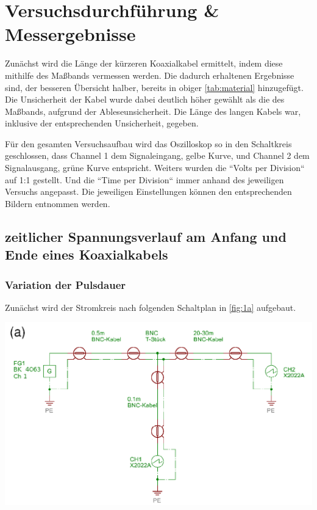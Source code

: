 \documentclass[11pt,ngerman]{scrartcl}
\begin{document}


\section{Versuchsdurchführung \& Messergebnisse}\label{sec:Versuchsdurchführung}

Zunächst wird die Länge der kürzeren Koaxialkabel ermittelt, indem diese
mithilfe des Maßbands vermessen werden. Die dadurch erhaltenen Ergebnisse sind,
der besseren Übersicht halber, bereits in obiger \autoref{tab:material}
hinzugefügt. Die Unsicherheit der Kabel wurde dabei deutlich höher gewählt als
die des Maßbands, aufgrund der Ableseunsicherheit. Die Länge des langen Kabels
war, inklusive der entsprechenden Unsicherheit, gegeben.

\vspace{2mm}

\noindent Für den gesamten Versuchsaufbau wird das Oszilloskop so in den
Schaltkreis geschlossen, dass Channel 1 dem Signaleingang, gelbe Kurve, und
Channel 2 dem Signalausgang, grüne Kurve entspricht.  Weiters wurden die
``Volts per Division`` auf 1:1 gestellt. Und die ``Time per Division`` immer
anhand des jeweiligen Versuchs angepasst. Die jeweiligen Einstellungen können
den entsprechenden Bildern entnommen werden.

\newpage

\subsection{zeitlicher Spannungsverlauf am Anfang und Ende eines Koaxialkabels}

\subsubsection{Variation der Pulsdauer}

Zunächst wird der Stromkreis nach folgenden Schaltplan in \autoref{fig:1a} aufgebaut.

\begin{center}
	\begin{minipage}[t]{0.8\textwidth}
		\includegraphics[width=\textwidth]{1a}
		\label{fig:1a}
	\end{minipage}
\end{center}
\end{document}
